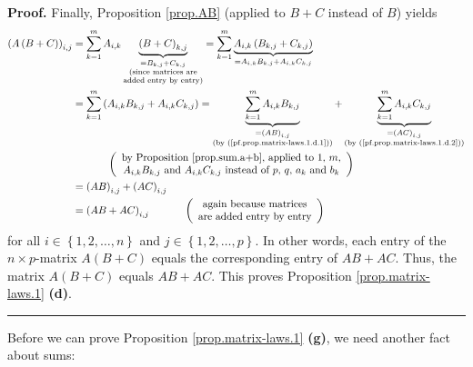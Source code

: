 \documentclass[numbers=enddot,12pt,final,onecolumn,notitlepage]{scrartcl}%
\theoremstyle{definition}
\newenvironment{proof}[1][Proof]{\noindent\textbf{#1.} }{\ \rule{0.5em}{0.5em}}
\let\sumnonlimits\sum
\renewcommand{\sum}{\sumnonlimits\limits}
\begin{document}
\begin{proof}
Finally, Proposition \ref{prop.AB} (applied to $B+C$ instead of $B$) yields%
\begin{align*}
\left(  A\left(  B+C\right)  \right)  _{i,j}  &  =\sum_{k=1}^{m}%
A_{i,k}\underbrace{\left(  B+C\right)  _{k,j}}_{\substack{=B_{k,j}%
+C_{k,j}\\\text{(since matrices are}\\\text{added entry by entry)}}%
}=\sum_{k=1}^{m}\underbrace{A_{i,k}\left(  B_{k,j}+C_{k,j}\right)  }%
_{=A_{i,k}B_{k,j}+A_{i,k}C_{k,j}}\\
&  =\sum_{k=1}^{m}\left(  A_{i,k}B_{k,j}+A_{i,k}C_{k,j}\right)
=\underbrace{\sum_{k=1}^{m}A_{i,k}B_{k,j}}_{\substack{=\left(  AB\right)
_{i,j}\\\text{(by (\ref{pf.prop.matrix-laws.1.d.1}))}}}+\underbrace{\sum
_{k=1}^{m}A_{i,k}C_{k,j}}_{\substack{=\left(  AC\right)  _{i,j}\\\text{(by
(\ref{pf.prop.matrix-laws.1.d.2}))}}}\\
&  \ \ \ \ \ \ \ \ \ \ \left(
\begin{array}
[c]{c}%
\text{by Proposition \ref{prop.sum.a+b}, applied to }1\text{, }m\text{,}\\
A_{i,k}B_{k,j}\text{ and }A_{i,k}C_{k,j}\text{ instead of }p\text{, }q\text{,
}a_{k}\text{ and }b_{k}%
\end{array}
\right) \\
&  =\left(  AB\right)  _{i,j}+\left(  AC\right)  _{i,j}\\
&  =\left(  AB+AC\right)  _{i,j}\ \ \ \ \ \ \ \ \ \ \left(
\begin{array}
[c]{c}%
\text{again because matrices}\\
\text{are added entry by entry}%
\end{array}
\right)
\end{align*}
for all $i\in\left\{  1,2,\ldots,n\right\}  $ and $j\in\left\{  1,2,\ldots
,p\right\}  $. In other words, each entry of the $n\times p$-matrix $A\left(
B+C\right)  $ equals the corresponding entry of $AB+AC$. Thus, the matrix
$A\left(  B+C\right)  $ equals $AB+AC$. This proves Proposition
\ref{prop.matrix-laws.1} \textbf{(d)}.
\end{proof}

Before we can prove Proposition \ref{prop.matrix-laws.1} \textbf{(g)}, we need
another fact about sums:
\end{document}
